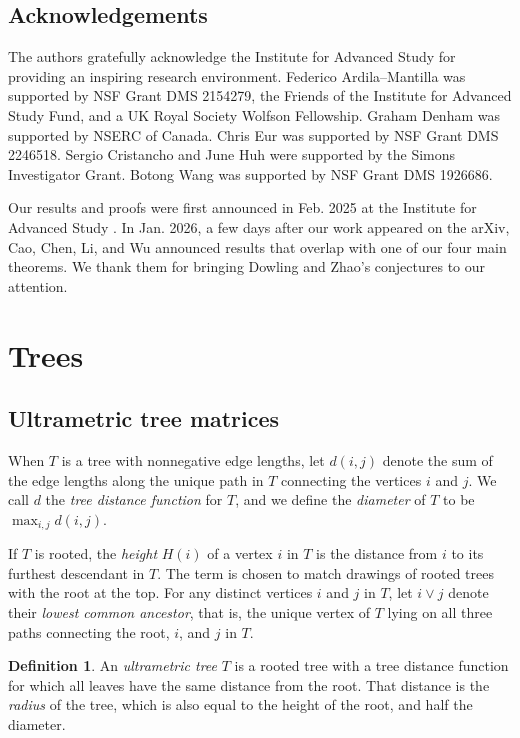 \documentclass{amsart}
\theoremstyle{definition}
\newtheorem{definition}[theorem]{Definition}
\theoremstyle{remark}
\newcommand{\1}{\mathbf{1}}
\numberwithin{equation}{section}
\begin{document}
\subsection*{Acknowledgements}
The authors gratefully acknowledge the Institute for Advanced Study for providing an inspiring research environment.
Federico Ardila--Mantilla was supported by NSF Grant DMS 2154279, the Friends of the Institute for Advanced Study Fund, and a UK Royal Society Wolfson Fellowship. Graham Denham was supported by NSERC of Canada.
Chris Eur was supported by NSF Grant DMS 2246518.
Sergio Cristancho and June Huh were supported by the Simons Investigator Grant.
Botong Wang was supported by NSF Grant DMS 1926686.

Our results and proofs were first  announced in Feb. 2025 at the Institute for Advanced Study \cite{ArdilaIAStalk2, ArdilaIAStalk1}. In Jan. 2026, a few days after our work appeared on the arXiv, Cao, Chen, Li, and Wu \cite{CCLW} announced results that overlap with one of our four main theorems. We thank them for bringing Dowling and Zhao’s conjectures to our attention.





\section{Trees}

\subsection{Ultrametric tree matrices} 

When $T$ is a tree with nonnegative edge lengths, let \(d(i,j)\) denote the
sum of the edge lengths along the unique path in $T$ connecting the vertices $i$ and $j$.
We call $d$ the \emph{tree distance function} for $T$, and we define the \emph{diameter}
of $T$ to be
$\displaystyle \max_{i,j} d(i,j)$.

If $T$ is rooted, the \emph{height} $H(i)$ of a vertex $i$ in $T$ is the
distance from $i$ to its furthest descendant in $T$. The term is chosen to match drawings of rooted trees
with the root at the top. For any distinct vertices $i$ and $j$ in $T$, let
$i \vee j$ denote their \emph{lowest common ancestor}, that is, the unique vertex of $T$ 
lying on all three paths connecting the root, $i$, and $j$ in $T$.

\begin{definition}\label{def:ultrametric}
  An \emph{ultrametric tree} $T$ is a rooted tree with a
  tree distance function for which 
  all leaves have the same distance from the root.  That
  distance is the \emph{radius} of the tree, which is also equal to the height of the root, and half the diameter.
\end{definition}
\end{document}
